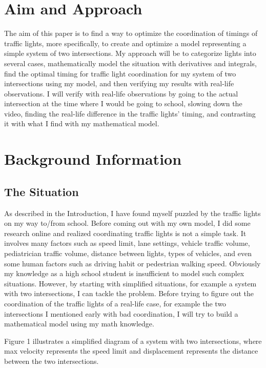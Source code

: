 \documentclass[11pt]{article}
\begin{document}
\section{Aim and Approach}
The aim of this paper is to find a way to optimize the coordination of timings of traffic lights, more specifically, to create and optimize a model representing a simple system of two intersections. My approach will be to categorize lights into several cases, mathematically model the situation with derivatives and integrals, find the optimal timing for traffic light coordination for my system of two intersections using my model, and then verifying my results with real-life observations. I will verify with real-life observations by going to the actual intersection at the time where I would be going to school, slowing down the video, finding the real-life difference in the traffic lights’ timing, and contrasting it with what I find with my mathematical model.

\section{Background Information}

\subsection{The Situation}

As described in the Introduction, I have found myself puzzled by the traffic lights on my way to/from school. Before coming out with my own model, I did some research online and realized coordinating traffic lights is not a simple task. It involves many factors such as speed limit, lane settings, vehicle traffic volume, pediatrician traffic volume, distance between lights, types of vehicles, and even some human factors such as driving habit or pedestrian walking speed. Obviously my knowledge as a high school student is insufficient to model such complex situations. However, by starting with simplified situations, for example a system with two intersections, I can tackle the problem. Before trying to figure out the coordination of the traffic lights of a real-life case, for example the two intersections I mentioned early with bad coordination, I will try to build a mathematical model using my math knowledge. 

Figure 1 illustrates a simplified diagram of a system with two intersections, where max velocity represents the speed limit and displacement represents the distance between the two intersections.
\newpage
\end{document}
